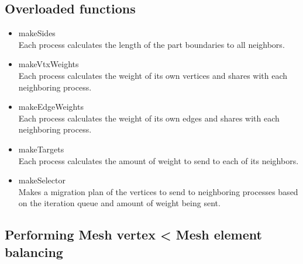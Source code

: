 \documentclass[a4paper]{article}
\begin{document}
\subsection{Overloaded functions}
\begin{itemize}
  \item makeSides\\
    Each process calculates the length of the part boundaries to all neighbors.
  \item makeVtxWeights \\
    Each process calculates the weight of its own vertices and shares with each neighboring process.
  \item makeEdgeWeights \\
    Each process calculates the weight of its own edges and shares with each neighboring process.
  \item makeTargets\\
    Each process calculates the amount of weight to send to each of its neighbors.
  \item makeSelector\\
    Makes a migration plan of the vertices to send to neighboring processes based on the iteration queue and amount of weight being sent.
\end{itemize}

\subsection{Performing Mesh vertex < Mesh element balancing}
\end{document}
